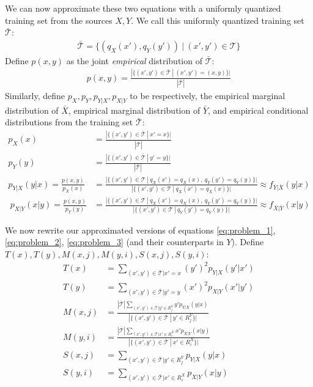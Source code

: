 We can now approximate these two equations with a uniformly quantized training set from the sources $X, Y$. We call this uniformly quantized training set $\mathcal{\bar T}$:
\begin{align}
    \mathcal{\bar T}=\{(q_X(x'),q_Y(y'))\ |\ (x',y')\in \mathcal T\}
\end{align}
Define $p(x,y)$ as the joint \emph{empirical} distribution of $\mathcal{\bar T}$:
\begin{align}
    p(x,y) = \frac{
        |\{(x',y')\in \mathcal{\bar T}\ |\ (x',y')=(x,y)\}|
        }{
        |\mathcal{\bar T}|
        }
\end{align}
Similarly, define $p_X, p_Y, p_{Y|X},p_{X|Y}$ to be respectively, the empirical marginal distribution of $\bar X$, empirical marginal distribution of $\bar Y$, and empirical conditional distributions from the training set $\mathcal{\bar T}$:
\begin{align}
    p_X(x) &= \frac{
        |\{(x',y')\in\mathcal{\bar T}\ |\ x'=x\}|
    }{
        |\mathcal{\bar T}|
    }\\
    p_Y(y) &= \frac{
        |\{(x',y')\in\mathcal{\bar T}\ |\ y'=y\}|
    }{
        |\mathcal{\bar T}|
    }\\
    \label{eq:cond_pmf_y}
    p_{Y|X}(y|x) = \frac{p(x,y)}{p_X(x)}
    &= \frac{
            |\{(x',y')\in \mathcal T\ |\ q_X(x')=q_X(x),\ q_Y(y')=q_Y(y)\}|
        }{
            |\{(x',y')\in \mathcal T\ |\ q_X(x')=q_X(x)\}|
        }\approx f_{\bar Y|\bar X}(y|x)\\\
    p_{X|Y}(x|y) = \frac{p(x,y)}{p_Y(y)}
    &=  \frac{
            |\{(x',y')\in \mathcal T\ |\ q_X(x')=q_X(x),\ q_Y(y')=q_Y(y)\}|
        }{
            |\{(x',y')\in \mathcal T\ |\ q_Y(y')=q_Y(y)\}|
        }\approx f_{\bar X|\bar Y}(x|y)
\end{align}

We now rewrite our approximated versions of equations \eqref{eq:problem_1}, \eqref{eq:problem_2}, \eqref{eq:problem_3} (and their counterparts in $Y$). Define $T(x),T(y),M(x,j),M(y,i),S(x,j),S(y,i)$:
\begin{align*}
    T(x) &= \sum_{(x',y')\in \mathcal{\bar T}|x'=x}(y')^2p_{Y|X}(y'|x')\\
    T(y) &= \sum_{(x',y')\in \mathcal{\bar T}|y'=y}(x')^2p_{X|Y}(x'|y')\\
    M(x,j) &= \frac{|\mathcal{\bar T}|\sum_{(x',y')\in \mathcal{\bar T}|y'\in R_j^Y}y'p_{Y|X}(y|x)}{|\{(x',y')\in \mathcal{\bar T}\ |\ y'\in R_j^Y\}|}\\
    M(y,i) &= \frac{|\mathcal{\bar T}|\sum_{(x',y')\in \mathcal{\bar T}|x'\in R_i^X}x'p_{X|Y}(x|y)}{|\{(x',y')\in \mathcal{\bar T}\ |\ x'\in R_i^X\}|}\\
    S(x,j) &= \sum_{(x',y')\in \mathcal{\bar T}|y'\in R_j^Y}p_{Y|X}(y|x)\\
    S(y,i) &= \sum_{(x',y')\in \mathcal{\bar T}|x'\in R_i^X}p_{X|Y}(x|y)
\end{align*}

